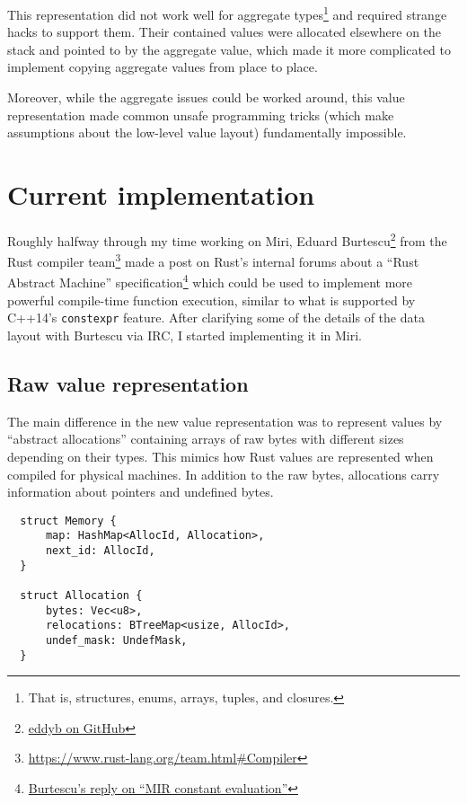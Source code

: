 \documentclass[twocolumn]{article}
\begin{document}
This representation did not work well for aggregate types\footnote{That is, structures, enums,
arrays, tuples, and closures.} and required strange hacks to support them. Their contained values
were allocated elsewhere on the stack and pointed to by the aggregate value, which made it more
complicated to implement copying aggregate values from place to place.

Moreover, while the aggregate issues could be worked around, this value representation made common
unsafe programming tricks (which make assumptions about the low-level value layout) fundamentally
impossible.


\section{Current implementation}

Roughly halfway through my time working on Miri, Eduard
Burtescu\footnote{\href{https://github.com/eddyb}{eddyb on GitHub}} from the Rust compiler
team\footnote{\url{https://www.rust-lang.org/team.html\#Compiler}} made a post on Rust's internal
forums about a ``Rust Abstract Machine''
specification\footnote{\href{https://internals.rust-lang.org/t/mir-constant-evaluation/3143/31}{Burtescu's
reply on ``MIR constant evaluation''}} which could be used to implement more powerful compile-time
function execution, similar to what is supported by C++14's \texttt{constexpr} feature.
After clarifying some of the details of the data layout with Burtescu via IRC, I started
implementing it in Miri.

\subsection{Raw value representation}

The main difference in the new value representation was to represent values by ``abstract
allocations'' containing arrays of raw bytes with different sizes depending on their types. This
mimics how Rust values are represented when compiled for physical machines. In addition to the raw
bytes, allocations carry information about pointers and undefined bytes.

\begin{verbatim}
  struct Memory {
      map: HashMap<AllocId, Allocation>,
      next_id: AllocId,
  }

  struct Allocation {
      bytes: Vec<u8>,
      relocations: BTreeMap<usize, AllocId>,
      undef_mask: UndefMask,
  }
\end{verbatim}
\end{document}
